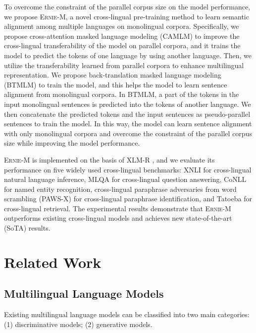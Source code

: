 \documentclass[11pt]{article}
\begin{document}
To overcome the constraint of the parallel corpus size on the model performance, we propose \textsc{Ernie-M}, a novel cross-lingual pre-training method to learn semantic alignment among multiple languages on monolingual corpora. Specifically, we propose cross-attention masked language modeling (CAMLM) to improve the cross-lingual transferability of the model on parallel corpora, and it trains the model to predict the tokens of one language by using another language. Then, we utilize the transferability learned from parallel corpora to enhance multilingual representation. We propose back-translation masked language modeling (BTMLM) to train the model, and this helps the model to learn sentence alignment from monolingual corpora. In BTMLM, a part of the tokens in the input monolingual sentences is predicted into the tokens of another language. We then concatenate the predicted tokens and the input sentences as pseudo-parallel sentences to train the model. In this way, the model can learn sentence alignment with only monolingual corpora and overcome the constraint of the parallel corpus size while improving the model performance.

\textsc{Ernie-M} is implemented on the basis of XLM-R \cite{conneau2019unsupervised}, and we evaluate its performance on five widely used cross-lingual benchmarks: XNLI \cite{conneau2018xnli} for cross-lingual natural language inference, MLQA \cite{lewis2019mlqa} for cross-lingual question answering, CoNLL \cite{sang2003introduction} for named entity recognition, cross-lingual paraphrase adversaries from word scrambling (PAWS-X) \cite{hu2020xtreme} for cross-lingual paraphrase identification, and Tatoeba \cite{hu2020xtreme} for cross-lingual retrieval. The experimental results demonstrate that \textsc{Ernie-M} outperforms existing cross-lingual models and achieves new state-of-the-art (SoTA) results.

\section{Related Work}
\subsection{Multilingual Language Models}

Existing multilingual language models can be classified into two main categories: (1) discriminative models; (2) generative models.
\end{document}
